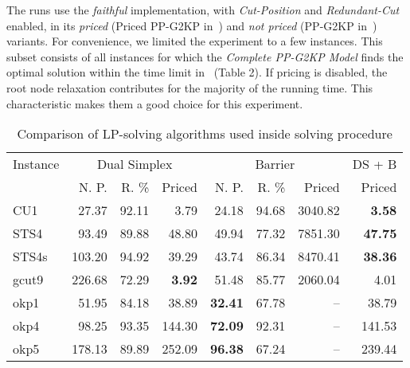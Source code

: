 \documentclass[ppgc,tese,english,formais,babel]{iiufrgs}
\begin{document}
The runs use the \emph{faithful} implementation, with \emph{Cut-Position} and \emph{Redundant-Cut} enabled, in its \emph{priced} (Priced PP-G2KP in~\citet{dimitri_thesis}) and \emph{not priced} (PP-G2KP in~\citet{dimitri_thesis}) variants.
For convenience, we limited the experiment to a few instances.
This subset consists of all instances for which the \emph{Complete PP-G2KP Model} finds the optimal solution within the time limit in~\citet{furini:2016} (Table 2).
If pricing is disabled, the root node relaxation contributes for the majority of the running time.
This characteristic makes them a good choice for this experiment.

\begin{table}
\centering
\caption{Comparison of LP-solving algorithms used inside solving procedure}
\begin{tabular}{@{\extracolsep{4pt}}lrrrrrrr@{}}
\hline\hline
Instance & \multicolumn{3}{c}{Dual Simplex} & \multicolumn{3}{c}{Barrier} & DS + B \\\cline{2-4}\cline{5-7}
& N. P. & R. \% & Priced & N. P. & R. \% & Priced & Priced \\\hline
CU1 & 27.37 & 92.11 & 3.79 & 24.18 & 94.68 & 3040.82 & \textbf{3.58} \\
STS4 & 93.49 & 89.88 & 48.80 & 49.94 & 77.32 & 7851.30 & \textbf{47.75} \\
STS4s & 103.20 & 94.92 & 39.29 & 43.74 & 86.34 & 8470.41 & \textbf{38.36} \\
gcut9 & 226.68 & 72.29 & \textbf{3.92} & 51.48 & 85.77 & 2060.04 & 4.01 \\
okp1 & 51.95 & 84.18 & 38.89 & \textbf{32.41} & 67.78 & -- & 38.79 \\
okp4 & 98.25 & 93.35 & 144.30 & \textbf{72.09} & 92.31 & -- & 141.53 \\
okp5 & 178.13 & 89.89 & 252.09 & \textbf{96.38} & 67.24 & -- & 239.44 \\\hline\hline
\end{tabular}
\label{tab:lp_method_comparison}
\end{table}
\end{document}
